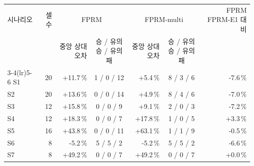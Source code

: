 \begin{tabular}{lrrcrcr}
\toprule
시나리오 & 셀 수 & \multicolumn{2}{c}{FPRM} & \multicolumn{2}{c}{FPRM-multi} & FPRM FPRM-E1 대비 \\
 & & 중앙 상대오차 & 승 / 유의승 / 유의패 & 중앙 상대오차 & 승 / 유의승 / 유의패 & \\
\cmidrule(lr){3-4}\cmidrule(lr){5-6}
\midrule
S1 & 20 & +11.7\,\% & 1 / 0 / 12 & +5.4\,\% & 8 / 3 / 6 & -7.6\,\% \\
S2 & 20 & +13.6\,\% & 0 / 0 / 14 & +4.9\,\% & 8 / 4 / 6 & -7.0\,\% \\
S3 & 12 & +15.8\,\% & 0 / 0 / 9 & +9.1\,\% & 2 / 0 / 3 & -7.2\,\% \\
S4 & 12 & +18.3\,\% & 0 / 0 / 7 & +17.8\,\% & 1 / 0 / 5 & +3.3\,\% \\
S5 & 16 & +43.8\,\% & 0 / 0 / 11 & +63.1\,\% & 1 / 1 / 9 & -0.5\,\% \\
S6 & 8 & -5.2\,\% & 5 / 5 / 2 & -5.2\,\% & 5 / 5 / 2 & -6.6\,\% \\
S7 & 8 & +49.2\,\% & 0 / 0 / 7 & +49.2\,\% & 0 / 0 / 7 & +0.0\,\% \\
\bottomrule
\end{tabular}
